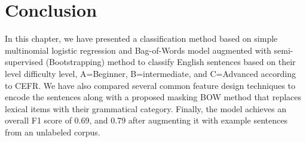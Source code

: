\section {Conclusion}
\label{sec:conclusion}
In this chapter, we have presented a classification method based on simple multinomial logistic regression and Bag-of-Words model augmented with semi-supervised (Bootstrapping) method to classify English sentences based on their level difficulty level, A=Beginner, B=intermediate, and C=Advanced according to CEFR. We have also compared several common feature design techniques to encode the sentences along with a proposed masking BOW method that replaces lexical items with their grammatical category. Finally, the model achieves an overall F1 score of 0.69, and 0.79 after augmenting it with example sentences from an unlabeled corpus.
